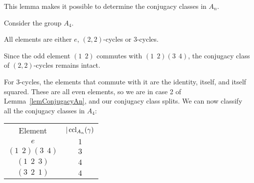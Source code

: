 \documentclass[../Main.tex]{subfiles}
\begin{document}
This lemma makes it possible to determine the conjugacy classes in $A_n$.
\begin{example}
    Consider the group $A_4$.\par
    All elements are either $e$, $(2, 2)$-cycles or $3$-cycles.\par
    Since the odd element $(1~~2)$ commutes with $(1~~2)(3~~4)$, the conjugacy class of $(2, 2)$-cycles remains intact.\par
    For $3$-cycles, the elements that commute with it are the identity, itself, and itself squared. These are all even elements, so we are in case 2 of Lemma~\ref{lemConjugacyAn}, and our conjugacy class splits.
    We can now classify all the conjugacy classes in $A_4$:\par
    \begin{tabular}{c|c}
        Element & $|\operatorname{ccl}_{A_n}(\gamma)$ \\
        $e$ & $1$ \\
        $(1~~2)(3~~4)$ & $3$ \\
        $(1~~2~~3)$ & $4$ \\
        $(3~~2~~1)$ & $4$ 
    \end{tabular}
\end{example}
\end{document}
